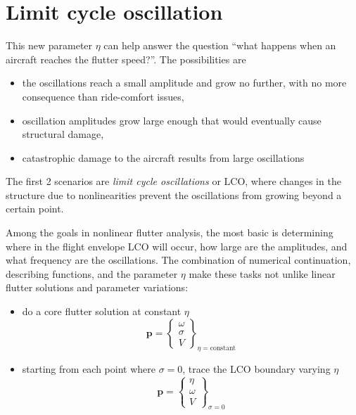 \documentclass[10pt,openany,twoside]{book}
\numberwithin{equation}{section}   %
\newcommand{\Vector}[1]{\boldsymbol{#1}}
\begin{document}
\section{Limit cycle oscillation}
This new parameter $\eta$ can help answer the question ``what happens
when an aircraft reaches the flutter speed?''. The possibilities are
\begin{itemize}
	\item the oscillations reach a small amplitude and grow no further,
		with no more consequence than ride-comfort issues,
	\item oscillation amplitudes grow large enough that would eventually
		cause structural damage,
	\item catastrophic damage to the aircraft results from large
		oscillations
\end{itemize}
The first 2 scenarios are \emph{limit cycle oscillations} or LCO,
where changes in the structure due to nonlinearities prevent the
oscillations from growing beyond a certain point.

Among the goals in nonlinear flutter analysis, the most basic is
determining where in the flight envelope LCO will occur, how large
are the amplitudes, and what frequency are the oscillations.
The combination of numerical continuation, describing functions,
and the parameter $\eta$ make these tasks not unlike linear flutter
solutions and parameter variations:
\begin{itemize}
	\item do a core flutter solution at constant $\eta$
		\begin{equation}
			\Vector{p} = \left\{ \begin{array}{c}
				\omega \\
				\sigma \\
				V
			\end{array}\right\}_{\eta=\text{constant}} \nonumber
		\end{equation}
	\item starting from each point where $\sigma=0$, trace the LCO
			boundary varying $\eta$
		\begin{equation}
			\Vector{p} = \left\{ \begin{array}{c}
				\eta \\
				\omega \\
				V
			\end{array}\right\}_{\sigma=0} \nonumber
		\end{equation}
\end{itemize}
\end{document}
